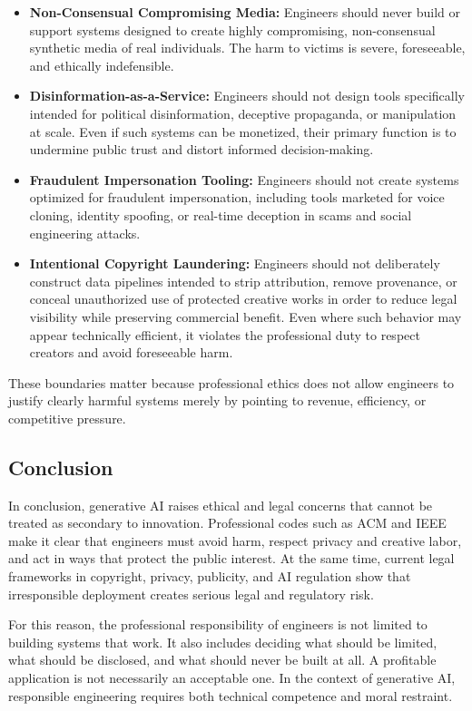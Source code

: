 \begin{itemize}
    \item \textbf{Non-Consensual Compromising Media:} Engineers should never build or support systems designed to create highly compromising, non-consensual synthetic media of real individuals. The harm to victims is severe, foreseeable, and ethically indefensible.

    \item \textbf{Disinformation-as-a-Service:} Engineers should not design tools specifically intended for political disinformation, deceptive propaganda, or manipulation at scale. Even if such systems can be monetized, their primary function is to undermine public trust and distort informed decision-making.

    \item \textbf{Fraudulent Impersonation Tooling:} Engineers should not create systems optimized for fraudulent impersonation, including tools marketed for voice cloning, identity spoofing, or real-time deception in scams and social engineering attacks.

    \item \textbf{Intentional Copyright Laundering:} Engineers should not deliberately construct data pipelines intended to strip attribution, remove provenance, or conceal unauthorized use of protected creative works in order to reduce legal visibility while preserving commercial benefit. Even where such behavior may appear technically efficient, it violates the professional duty to respect creators and avoid foreseeable harm.
\end{itemize}

These boundaries matter because professional ethics does not allow engineers to justify clearly harmful systems merely by pointing to revenue, efficiency, or competitive pressure.

\subsection{Conclusion}\label{sec:ethics-conclusion}

In conclusion, generative AI raises ethical and legal concerns that cannot be treated as secondary to innovation. Professional codes such as ACM and IEEE make it clear that engineers must avoid harm, respect privacy and creative labor, and act in ways that protect the public interest. At the same time, current legal frameworks in copyright, privacy, publicity, and AI regulation show that irresponsible deployment creates serious legal and regulatory risk.

For this reason, the professional responsibility of engineers is not limited to building systems that work. It also includes deciding what should be limited, what should be disclosed, and what should never be built at all. A profitable application is not necessarily an acceptable one. In the context of generative AI, responsible engineering requires both technical competence and moral restraint.
